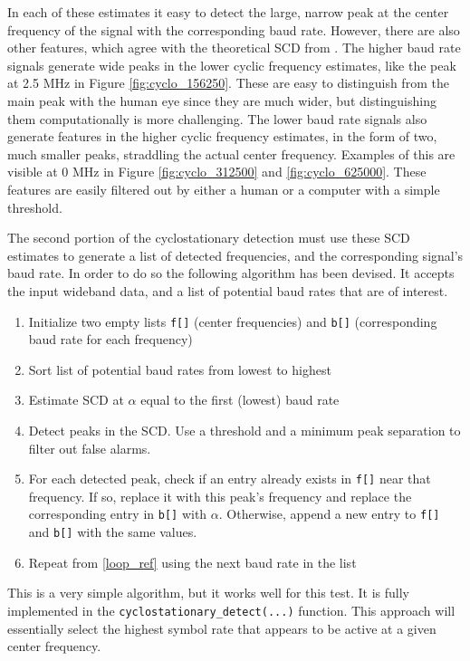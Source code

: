 \documentclass[12pt]{article}
\begin{document}
In each of these estimates it easy to detect the large, narrow peak at the
center frequency of the signal with the corresponding baud rate. However, there
are also other features, which agree with the theoretical SCD from
\cite{Gardner2}.  The higher baud rate signals generate wide peaks in the lower
cyclic frequency estimates, like the peak at 2.5 MHz in Figure
\ref{fig:cyclo_156250}. These are easy to distinguish from the main peak with
the human eye since they are much wider, but distinguishing them computationally
is more challenging. The lower baud rate signals also generate features in the
higher cyclic frequency estimates, in the form of two, much smaller peaks,
straddling the actual center frequency. Examples of this are visible at 0 MHz
in Figure \ref{fig:cyclo_312500} and \ref{fig:cyclo_625000}. These features are
easily filtered out by either a human or a computer with a simple threshold.

The second portion of the cyclostationary detection must use these SCD estimates to 
generate a list of detected frequencies, and the corresponding signal's
baud rate. In order to do so the following algorithm has been devised. It accepts the input wideband data, and a list of potential baud rates that are of interest.

\begin{enumerate}
    \item Initialize two empty lists \texttt{f[]} (center frequencies) and \texttt{b[]} (corresponding baud rate for each frequency)
    \item Sort list of potential baud rates from lowest to highest
    \item Estimate SCD at $\alpha$ equal to the first (lowest) baud rate
    \label{loop_ref}
    \item Detect peaks in the SCD. Use a threshold and a minimum peak separation
        to filter out false alarms.
    \item For each detected peak, check if an entry already exists in
        \texttt{f[]} near that frequency. If so, replace it with this peak's
        frequency and replace the corresponding entry in \texttt{b[]} with
        $\alpha$. Otherwise, append a new entry to \texttt{f[]} and
        \texttt{b[]} with the same values.
    \item Repeat from \ref{loop_ref} using the next baud rate in the list
\end{enumerate}

This is a very simple algorithm, but it works well for this test. It is
fully implemented in the \texttt{cyclostationary\_detect(...)} function. This approach will essentially select the highest symbol rate that appears to be active at a given center frequency.
\end{document}

